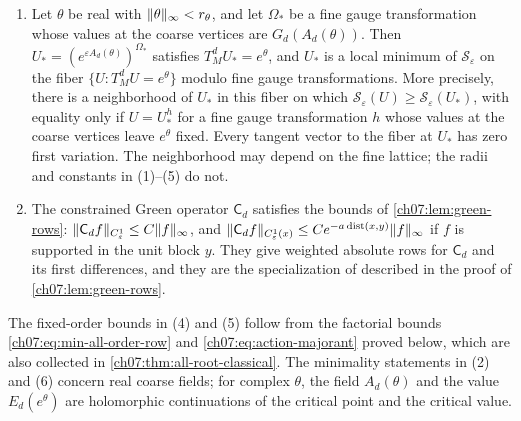 \begin{theorem}
\begin{enumerate}
\[
 \nabla_\theta E_d=(I-D\mathsf D_d(w)\mathsf H_d)^T\mathsf J_d(w).
\]
For each $s\ge2$ there exist $a_s,C_s>0$ such that $\norm{D^sE_d}_{a_s,\mathrm{root}}\le C_s$. For $g>0$ let $W_{d,g}(B)=g^{-2}E_d(e^{gB})$. If $\norm{gB}_\infty<r_\theta/2$, then
\[
 \norm{D_B^sW_{d,g}}_{a_s,\mathrm{root}}\le C_sg^{s-2}\quad(s\ge2),\qquad
 \norm{D_BW_{d,g}}_\infty\le C\norm B_\infty .
\]
\item Let $\theta$ be real with $\lVert \theta\rVert_\infty<r_\theta$, and let $\Omega_*$ be a fine gauge transformation whose values at the coarse vertices are $G_d(A_d(\theta))$. Then $U_*=(e^{\varepsilon A_d(\theta)})^{\Omega_*}$ satisfies $T_M^dU_*=e^\theta$, and $U_*$ is a local minimum of $\mathscr S_\varepsilon$ on the fiber $\{U:T_M^dU=e^\theta\}$ modulo fine gauge transformations. More precisely, there is a neighborhood of $U_*$ in this fiber on which $\mathscr S_\varepsilon(U)\ge\mathscr S_\varepsilon(U_*)$, with equality only if $U=U_*^h$ for a fine gauge transformation $h$ whose values at the coarse vertices leave $e^\theta$ fixed. Every tangent vector to the fiber at $U_*$ has zero first variation. The neighborhood may depend on the fine lattice; the radii and constants in (1)--(5) do not.
\item The constrained Green operator $\mathsf C_d$ satisfies the bounds of \cref{ch07:lem:green-rows}: $\lVert \mathsf C_df\rVert_{C^1_\varepsilon}\le C\lVert f\rVert_\infty$, and $\lVert \mathsf C_df\rVert_{C^1_\varepsilon(x)}\le Ce^{-a\operatorname{dist}(x,y)}\lVert f\rVert_\infty$ if $f$ is supported in the unit block $y$. They give weighted absolute rows for $\mathsf C_d$ and its first differences, and they are the specialization of \cite[Theorem~3.13, p.~426]{Balaban1985Background} described in the proof of \cref{ch07:lem:green-rows}.
\end{enumerate}
\end{theorem}

The fixed-order bounds in (4) and (5) follow from the factorial bounds \eqref{ch07:eq:min-all-order-row} and \eqref{ch07:eq:action-majorant} proved below, which are also collected in \cref{ch07:thm:all-root-classical}. The minimality statements in (2) and (6) concern real coarse fields; for complex $\theta$, the field $A_d(\theta)$ and the value $E_d(e^\theta)$ are holomorphic continuations of the critical point and the critical value.


